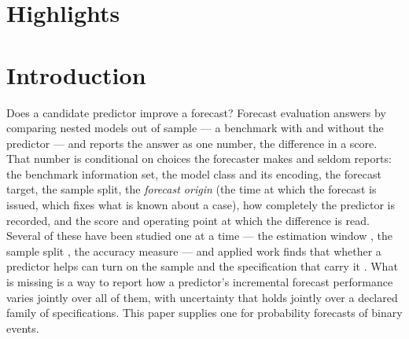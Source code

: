 \section*{Highlights}
\begin{itemize}\itemsep0pt
\highlightsList{}
\end{itemize}

\section{Introduction}
\label{sec:intro}

Does a candidate predictor improve a forecast? Forecast evaluation answers by
comparing nested models out of sample --- a benchmark with and without the
predictor \citep{clark2001nested,clark2007approximately} --- and reports the
answer as one number, the difference in a score. That number is conditional
on choices the forecaster makes and seldom reports: the benchmark information
set, the model class and its encoding, the forecast target, the sample split,
the \emph{forecast origin} (the time at which the forecast is issued, which
fixes what is known about a case), how completely the predictor is recorded,
and the score and operating point at which the difference is read. Several
of these have been studied one at a time --- the estimation window
\citep{rossi2012window}, the sample split \citep{hansen2012sample}, the
accuracy measure \citep{kolassa2020best} --- and applied work finds that
whether a predictor helps can turn on the sample and the specification that
carry it \citep{stock2003forecasting,welch2008comprehensive,banbura2023phillips}. What is missing is a way to report how a
predictor's incremental forecast performance varies jointly over all of them,
with uncertainty that holds jointly over a declared family of specifications. This paper supplies one
for probability forecasts of binary events.

